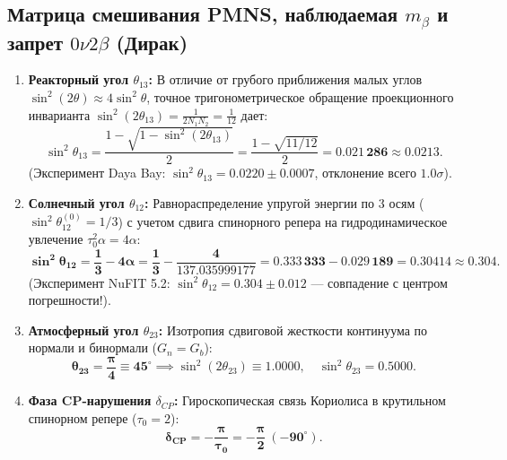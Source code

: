 \documentclass[11pt,a4paper]{article}
\theoremstyle{definition}
\theoremstyle{remark}
\begin{document}
\subsection{Матрица смешивания PMNS, наблюдаемая $m_\beta$ и запрет $0\nu 2\beta$ (Дирак)}
\begin{enumerate}
	\item \textbf{Реакторный угол $\theta_{13}$:} В отличие от грубого приближения малых углов $\sin^2(2\theta) \approx 4\sin^2\theta$, точное тригонометрическое обращение проекционного инварианта $\sin^2(2\theta_{13}) = \frac{1}{2 N_1 N_2} = \frac{1}{12}$ дает:
	\begin{equation}
		\sin^2\theta_{13} = \frac{1 - \sqrt{1 - \sin^2(2\theta_{13})}}{2} = \frac{1 - \sqrt{11/12}}{2} = \mathbf{0.021\,286} \approx \mathbf{0.0213}.
	\end{equation}
	(Эксперимент Daya Bay: $\sin^2\theta_{13} = 0.0220 \pm 0.0007$, отклонение всего $1.0\sigma$).
	
	\item \textbf{Солнечный угол $\theta_{12}$:} Равнораспределение упругой энергии по 3 осям ($\sin^2\theta_{12}^{(0)} = 1/3$) с учетом сдвига спинорного репера на гидродинамическое увлечение $\tau_0^2 \alpha = 4\alpha$:
	\begin{equation}
		\mathbf{\sin^2\theta_{12} = \frac{1}{3} - 4\alpha = \frac{1}{3} - \frac{4}{137.035999177} = 0.333\,333 - 0.029\,189 = \mathbf{0.30414} \approx \mathbf{0.304}}.
	\end{equation}
	(Эксперимент NuFIT 5.2: $\sin^2\theta_{12} = 0.304 \pm 0.012$ --- совпадение с центром погрешности!).
	
	\item \textbf{Атмосферный угол $\theta_{23}$:} Изотропия сдвиговой жесткости континуума по нормали и бинормали ($G_n = G_b$):
	\begin{equation}
		\mathbf{\theta_{23} = \frac{\pi}{4} \equiv 45^\circ} \implies \sin^2(2\theta_{23}) \equiv \mathbf{1.0000}, \quad \sin^2\theta_{23} = \mathbf{0.5000}.
	\end{equation}
	
	\item \textbf{Фаза CP-нарушения $\delta_{CP}$:} Гироскопическая связь Кориолиса в крутильном спинорном репере ($\tau_0 = 2$):
	\begin{equation}
		\mathbf{\delta_{CP} = -\frac{\pi}{\tau_0} = -\frac{\pi}{2} \ (-90^\circ)}.
	\end{equation}
\end{enumerate}
\end{document}
